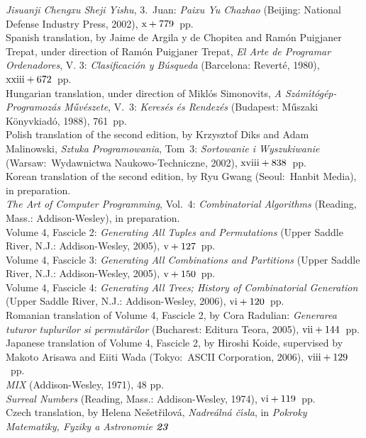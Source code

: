  {\sl Jisuanji Chengxu Sheji Yishu}, 3.\ Juan: {\sl Paixu Yu Chazhao\/}
 (Beijing: National Defense Industry Press, 2002), $\rm x+779$~pp.
\\Spanish translation, by Jaime de Argila y de Chopitea and
 Ram\'on Puigjaner Trepat, under direction of Ram\'on Puig\-janer Trepat,
 {\sl El Arte de Programar Ordenadores}, V. 3: {\sl Clasificaci\'on
 y B\'usqueda\/} (Barcelona: Revert\'e, 1980), $\rm xxiii + 672$~pp.
\\Hungarian translation, under direction of Mikl\'os Simonovits,
 {\sl A Sz\'am\'\i t\'og\'ep-Programoz\'as M\H uv\'eszete}, V.~3:
 {\sl Keres\'es \'es Rendez\'es\/}
 (Budapest: M\H uszaki K\"onyvkiad\'o, 1988), 761~pp.
\\Polish translation of the second edition, by Krzysztof Diks and Adam
 Malinowski,
 {\sl Sztuka Programowania}, Tom~3: {\sl Sortowanie i Wyszukiwanie\/}
 (Warsaw:\ Wydawnictwa Naukowo-Techniczne, 2002), $\rm xviii+838$~pp.
\\Korean translation of the second edition, by Ryu Gwang (Seoul:\ Hanbit Media),
 in preparation.
\yyskip
\\{\sl The Art of Computer Programming}, Vol.\ 4:
 {\sl Combinatorial Algorithms}
 (Reading, Mass.: Addison-Wesley), in preparation.
\\Volume 4, Fascicle 2: {\sl Generating All Tuples and Permutations\/}
 (Upper Saddle River, N.J.: Addison-Wesley, 2005), $\rm v+127$~pp.
\\Volume 4, Fascicle 3: {\sl Generating All Combinations and Partitions\/}
 (Upper Saddle River, N.J.: Addison-Wesley, 2005), $\rm v+150$~pp.
\\Volume 4, Fascicle 4: {\sl Generating All Trees; History of Combinatorial
 Generation\/} (Upper Saddle River, N.J.: Addison-Wesley, 2006),
 $\rm vi+120$~pp.
\\Romanian translation of Volume 4, Fascicle 2, by Cora Radulian:
 {\sl Generarea tuturor tuplurilor si
 permut\u{a}rilor\/} (Bucharest: Editura Teora, 2005), $\rm vii+144$~pp. 
\\Japanese translation of Volume 4, Fascicle 2, by Hiroshi Koide, supervised
 by Makoto Arisawa and Eiiti Wada (Tokyo:\ ASCII Corporation, 2006), 
 $\rm viii+129$~pp. 
\yyskip
\\{\sl MIX} (Addison-Wesley, 1971), 48 pp.
\yyskip
\\{\sl Surreal Numbers} (Reading, Mass.: Addison-Wesley, 1974), $\rm vi
 + 119$~pp.
\\Czech translation, by Helena Ne\v set\v rilov\'a, {\sl Nadre\'aln\'a
 \v c\' \i sla}, in {\sl Pokroky Matematiky, Fyziky a Astronomie \bf 23}
